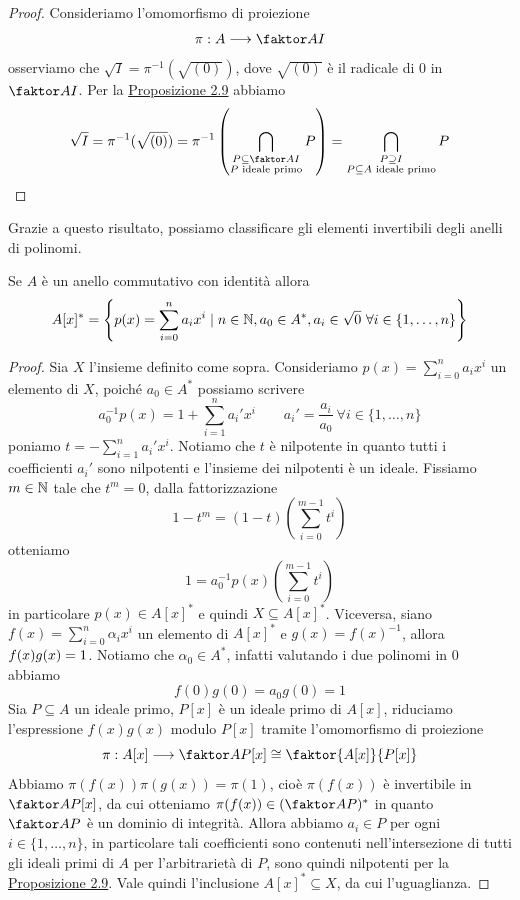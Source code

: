 \documentclass[11pt]{scrartcl}
\begin{document}
	\begin{proof}
		Consideriamo l'omomorfismo di proiezione
		\[
		\pi: A\longrightarrow \faktor A I
		\]
		osserviamo che $\sqrt{I} = \pi^{-1}(\sqrt{(0)})$, dove $\sqrt{(0)}$ è il radicale di 
		$0$ in $\faktor A I$. Per la \hyperref[prop2.9]{Proposizione 2.9}
		abbiamo
		\[
		\sqrt{I} = \pi^{-1}(\sqrt{(0)}) = \pi^{-1}\left(\bigcap_{\substack{
				P\subseteq \faktor A I\\ P \text{ ideale primo}}} P\right) = 
		\bigcap_{\substack{P\supseteq I\\P \subseteq A\text{ ideale primo}}}P
		\]
	\end{proof}
	
	Grazie a questo risultato, possiamo classificare gli elementi invertibili 
	degli anelli di polinomi.
	
	\begin{proposition}
		Se $A$ è un anello commutativo con identità allora 
		\[
		A[x]^* = \left\{p(x) = \sum_{i = 0}^n a_ix^i\mid n \in \mathbb N,
		a_0 \in A^*, a_i \in \sqrt{0}~\forall i \in \{1, \ldots, n\}\right\}
		\]
	\end{proposition}
	
	\begin{proof}
		Sia $X$ l'insieme definito come sopra. Consideriamo 
		$p(x) = \displaystyle\sum_{i = 0}^n a_i x^i$ un elemento di $X$, poiché
		$a_0 \in A^*$ possiamo scrivere 
		\[
		a_0^{-1}p(x) = 1 + \sum_{i = 1}^n a_i'x^i \qquad 
		a_i' = \frac{a_i}{a_0}~\forall i \in \{1, \ldots,n\}
		\]
		poniamo $t = \displaystyle -\sum_{i = 1}^n a_i'x^i$. Notiamo che $t$ è
		nilpotente in quanto tutti i coefficienti $a_i'$ sono nilpotenti e l'insieme
		dei nilpotenti è un ideale. Fissiamo $m \in \mathbb N$ tale che $t^m = 0$, 
		dalla fattorizzazione 
		\[
		1 - t^m = (1 - t)\left(\sum_{i = 0}^{m - 1}t^i\right)
		\]
		otteniamo 
		\[
		1 = a_0^{-1}p(x)\left(\sum_{i = 0}^{m - 1}t^i\right)
		\]
		in particolare $p(x) \in A[x]^*$ e quindi $X \subseteq A[x]^*$.\newline
		Viceversa, siano $f(x) = \displaystyle\sum_{i = 0}^n\alpha_ix^i$ un 
		elemento di $A[x]^*$ e $g(x) = f(x)^{-1}$, allora $f(x)g(x) = \nolinebreak 1$.
		Notiamo che $\alpha_0 \in A^*$, infatti valutando i due polinomi in 0
		abbiamo
		\[
		f(0)g(0) = a_0g(0) = 1
		\]
		Sia $P \subseteq A$ un ideale primo, $P[x]$ è un ideale primo di $A[x]$,
		riduciamo l'espressione $f(x)g(x)$ modulo $P[x]$ tramite l'omomorfismo 
		di proiezione
		\[
		\pi: A[x]\longrightarrow \faktor A P [x] \cong \faktor{A[x]}{P[x]}
		\]
		Abbiamo $\pi(f(x))\pi(g(x)) = \pi(1)$, cioè $\pi(f(x))$ è invertibile in 
		$\faktor A P [x]$, da cui otteniamo $\pi(f(x)) \in (\faktor A P)^*$ in quanto $\faktor A P$
		è un dominio di integrità. Allora abbiamo $a_i \in P$ per ogni $i \in \{1, \ldots, n\}$,
		in particolare tali coefficienti sono contenuti nell'intersezione di tutti
		gli ideali primi di $A$ per l'arbitrarietà di $P$, sono quindi nilpotenti
		per la \hyperref[prop2.9]{Proposizione 2.9}. Vale quindi l'inclusione 
		$A[x]^* \subseteq X$, da cui l'uguaglianza.
	\end{proof}
	
\end{document}
